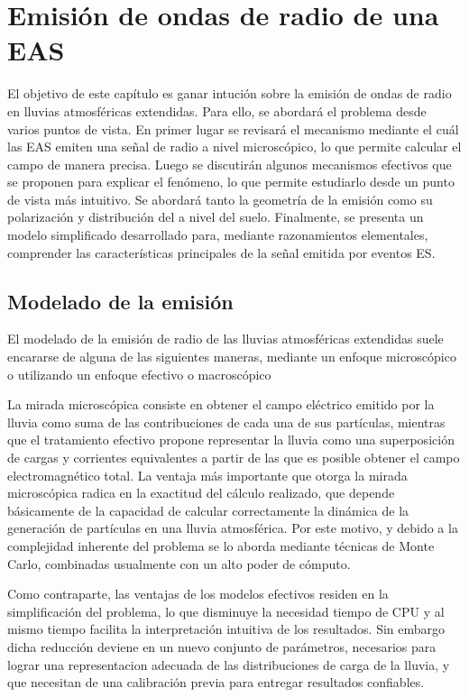\chapter{Emisi\'on de ondas de radio de una EAS}
\label{ch:easRadio}

El objetivo de este cap\'itulo es ganar intuci\'on sobre la emisión de ondas de radio en lluvias atmosféricas extendidas.
Para ello, se abordar\'a el problema desde varios puntos de vista.
En primer lugar se revisar\'a el mecanismo mediante el cu\'al las EAS emiten una se\~nal de radio a nivel microsc\'opico, lo que permite calcular el campo de manera precisa. 
Luego se discutir\'an algunos mecanismos efectivos que se proponen para explicar el fen\'omeno, lo que permite estudiarlo desde un punto de vista m\'as intuitivo.
Se abordar\'a tanto la geometr\'ia de la emisi\'on como su polarizaci\'on y distribuci\'on del a nivel del suelo.
Finalmente, se presenta un modelo simplificado desarrollado para, mediante razonamientos elementales, comprender las caracter\'isticas principales de la se\~nal emitida por eventos ES.

\section{Modelado de la emisi\'on}
\label{sc:gen_emision}

El modelado de la emisi\'on de radio de las lluvias atmosf\'ericas extendidas suele encararse de alguna de las siguientes maneras, mediante un enfoque microsc\'opico o utilizando un enfoque efectivo o macrosc\'opico

La mirada microsc\'opica consiste en obtener el campo el\'ectrico emitido por la lluvia como suma de las contribuciones de cada una de sus part\'iculas, mientras que el tratamiento efectivo propone representar la lluvia como una superposici\'on de cargas y corrientes equivalentes a partir de las que es posible obtener el campo electromagn\'etico total.
La ventaja m\'as importante que otorga la mirada microsc\'opica radica en la exactitud del c\'alculo realizado, que depende b\'asicamente de la capacidad de calcular correctamente la din\'amica de la generaci\'on de part\'iculas en una lluvia atmosf\'erica.
Por este motivo, y debido a la complejidad inherente del problema se lo aborda mediante t\'ecnicas de Monte Carlo, combinadas usualmente con un alto poder de c\'omputo.

Como contraparte, las ventajas de los modelos efectivos residen en la simplificaci\'on del problema, lo que disminuye la necesidad tiempo de CPU y al mismo tiempo facilita la interpretaci\'on intuitiva de los resultados. 
Sin embargo dicha reducci\'on deviene en un nuevo conjunto de par\'ametros, necesarios para lograr una representacion adecuada de las distribuciones de carga de la lluvia, y que necesitan de una calibraci\'on previa para entregar resultados confiables.

